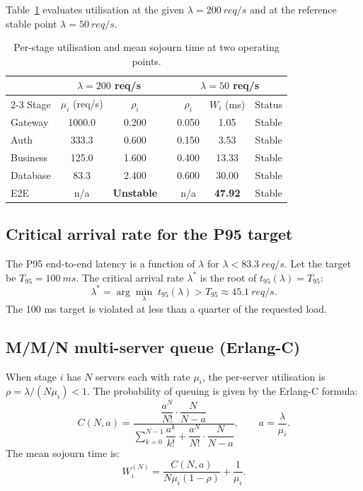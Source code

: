 \documentclass[12pt,a4paper]{article}
\begin{document}
Table~\ref{tab:utilisation} evaluates utilisation at the given $\lambda = \SI{200}{req/s}$
and at the reference stable point $\lambda = \SI{50}{req/s}$.

\begin{table}[H]
\centering
\caption{Per-stage utilisation and mean sojourn time at two operating points.}
\label{tab:utilisation}
\begin{tabular}{lcccccc}
\toprule
 & \multicolumn{2}{c}{$\lambda = 200$ req/s} && \multicolumn{3}{c}{$\lambda = 50$ req/s} \\
\cmidrule{2-3}\cmidrule{5-7}
Stage & $\mu_i$ (req/s) & $\rho_i$ && $\rho_i$ & $W_i$ (ms) & Status \\
\midrule
Gateway  & 1000.0 & 0.200 && 0.050 &  1.05 & Stable \\
Auth     &  333.3 & 0.600 && 0.150 &  3.53 & Stable \\
Business &  125.0 & 1.600 && 0.400 & 13.33 & Stable \\
Database &   83.3 & 2.400 && 0.600 & 30.00 & Stable \\
\midrule
E2E & n/a & \textbf{Unstable} && n/a & \textbf{47.92} & Stable \\
\bottomrule
\end{tabular}
\end{table}

\subsection{Critical arrival rate for the P95 target}

The P95 end-to-end latency is a function of $\lambda$ for $\lambda < \SI{83.3}{req/s}$.
Let the target be $T_{95} = \SI{100}{ms}$. The critical arrival rate $\lambda^*$ is the
root of $t_{95}(\lambda) = T_{95}$:
\begin{equation}
  \lambda^* = \arg\min_{\lambda}\; t_{95}(\lambda) > T_{95} \approx \SI{45.1}{req/s}.
  \label{eq:lam_star}
\end{equation}
The 100 ms target is violated at less than a quarter of the requested load.

\subsection{M/M/N multi-server queue (Erlang-C)}

When stage $i$ has $N$ servers each with rate $\mu_i$, the per-server utilisation is
$\rho = \lambda/(N\mu_i) < 1$. The probability of queuing is given by the Erlang-C formula:
\begin{equation}
  C(N, a) = \frac{\dfrac{a^N}{N!}\cdot\dfrac{N}{N-a}}
            {\displaystyle\sum_{k=0}^{N-1}\dfrac{a^k}{k!}
             + \dfrac{a^N}{N!}\cdot\dfrac{N}{N-a}},
  \qquad a = \frac{\lambda}{\mu_i}.
  \label{eq:erlang_c}
\end{equation}
The mean sojourn time is:
\begin{equation}
  W_i^{(N)} = \frac{C(N,a)}{N\mu_i(1-\rho)} + \frac{1}{\mu_i}.
  \label{eq:mmn_W}
\end{equation}
\end{document}

